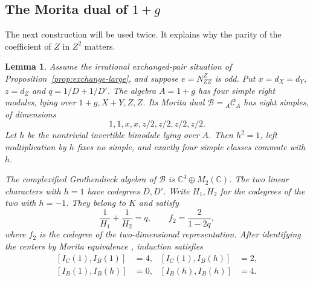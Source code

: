 \documentclass[11pt,a4paper]{article}
\newtheorem{lemma}[theorem]{Lemma}
\numberwithin{equation}{section}
\begin{document}

\subsection{The Morita dual of $1+g$}
The next construction will be used twice. It explains why the parity
of the coefficient of $Z$ in $Z^2$ matters.

\begin{lemma}\label{lem:exchange-morita}
Assume the irrational exchanged-pair situation of
Proposition~\ref{prop:exchange-large}, and suppose $e=N_{ZZ}^Z$ is odd.
Put $x=d_X=d_Y$, $z=d_Z$ and $q=1/D+1/D'$.
The algebra $A=1+g$ has four simple right modules, lying over
$1+g,X+Y,Z,Z$. Its Morita dual
$\mathcal B={}_A\mathcal C_A$ has eight simples, of dimensions
\[
 1,1,x,x,z/2,z/2,z/2,z/2.
\]
Let $h$ be the nontrivial invertible bimodule lying over $A$.
Then $h^2=1$, left multiplication by $h$ fixes no simple, and
exactly four simple classes commute with $h$.

The complexified Grothendieck algebra of $\mathcal B$ is
$\mathbb C^4\oplus M_2(\mathbb C)$. The two linear characters with
$h=1$ have codegrees $D,D'$. Write $H_1,H_2$ for the codegrees of
the two with $h=-1$. They belong to $K$ and satisfy
\[
 \frac1{H_1}+\frac1{H_2}=q,\qquad
 f_{2}=\frac2{1-2q},
\]
where $f_2$ is the codegree of the two-dimensional representation.
After identifying the centers by Morita equivalence
\cite{SchCenter}, induction satisfies
\begin{equation}\label{eq:exchange-morita-pairings}
\begin{aligned}
 [I_C(1),I_B(1)]&=4,&[I_C(1),I_B(h)]&=2,\\
 [I_B(1),I_B(h)]&=0,&[I_B(h),I_B(h)]&=4.
\end{aligned}
\end{equation}
\end{lemma}
\end{document}
